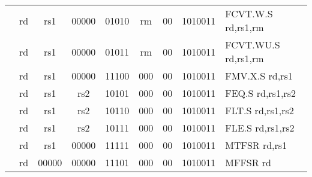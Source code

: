\begin{table}[p]
\begin{small}
\begin{center}
\begin{tabular}{rccccccccccl}
&
\multicolumn{1}{|c|}{rd} &
\multicolumn{1}{c|}{rs1} &
\multicolumn{1}{c|}{00000} &
\multicolumn{3}{c|}{01010} &
\multicolumn{2}{c|}{rm} &
\multicolumn{1}{c|}{00} &
\multicolumn{1}{c|}{1010011} & FCVT.W.S rd,rs1,rm \\
\cline{2-11}
  

&
\multicolumn{1}{|c|}{rd} &
\multicolumn{1}{c|}{rs1} &
\multicolumn{1}{c|}{00000} &
\multicolumn{3}{c|}{01011} &
\multicolumn{2}{c|}{rm} &
\multicolumn{1}{c|}{00} &
\multicolumn{1}{c|}{1010011} & FCVT.WU.S rd,rs1,rm \\
\cline{2-11}
  

&
\multicolumn{1}{|c|}{rd} &
\multicolumn{1}{c|}{rs1} &
\multicolumn{1}{c|}{00000} &
\multicolumn{3}{c|}{11100} &
\multicolumn{2}{c|}{000} &
\multicolumn{1}{c|}{00} &
\multicolumn{1}{c|}{1010011} & FMV.X.S rd,rs1 \\
\cline{2-11}
  

&
\multicolumn{1}{|c|}{rd} &
\multicolumn{1}{c|}{rs1} &
\multicolumn{1}{c|}{rs2} &
\multicolumn{3}{c|}{10101} &
\multicolumn{2}{c|}{000} &
\multicolumn{1}{c|}{00} &
\multicolumn{1}{c|}{1010011} & FEQ.S rd,rs1,rs2 \\
\cline{2-11}
  

&
\multicolumn{1}{|c|}{rd} &
\multicolumn{1}{c|}{rs1} &
\multicolumn{1}{c|}{rs2} &
\multicolumn{3}{c|}{10110} &
\multicolumn{2}{c|}{000} &
\multicolumn{1}{c|}{00} &
\multicolumn{1}{c|}{1010011} & FLT.S rd,rs1,rs2 \\
\cline{2-11}
  

&
\multicolumn{1}{|c|}{rd} &
\multicolumn{1}{c|}{rs1} &
\multicolumn{1}{c|}{rs2} &
\multicolumn{3}{c|}{10111} &
\multicolumn{2}{c|}{000} &
\multicolumn{1}{c|}{00} &
\multicolumn{1}{c|}{1010011} & FLE.S rd,rs1,rs2 \\
\cline{2-11}
  

&
\multicolumn{1}{|c|}{rd} &
\multicolumn{1}{c|}{rs1} &
\multicolumn{1}{c|}{00000} &
\multicolumn{3}{c|}{11111} &
\multicolumn{2}{c|}{000} &
\multicolumn{1}{c|}{00} &
\multicolumn{1}{c|}{1010011} & MTFSR rd,rs1 \\
\cline{2-11}
  

&
\multicolumn{1}{|c|}{rd} &
\multicolumn{1}{c|}{00000} &
\multicolumn{1}{c|}{00000} &
\multicolumn{3}{c|}{11101} &
\multicolumn{2}{c|}{000} &
\multicolumn{1}{c|}{00} &
\multicolumn{1}{c|}{1010011} & MFFSR rd \\
\cline{2-11}
  

\end{tabular}
\end{center}
\end{small}

\label{instr-table}
\end{table}
  

